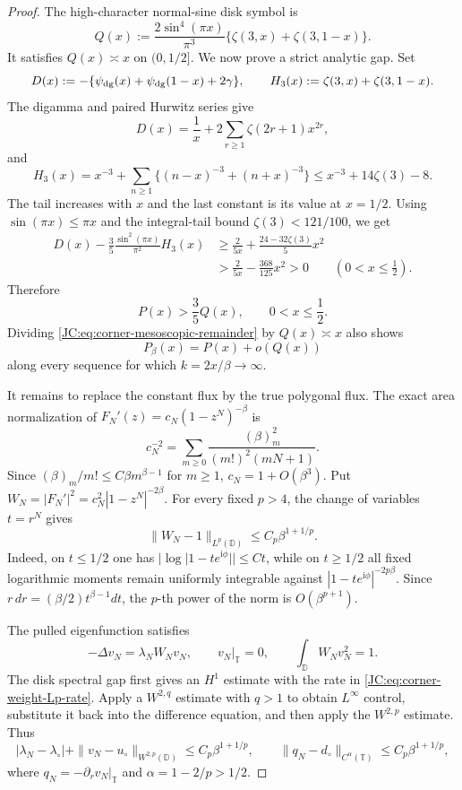 \begin{proof}
The high-character normal-sine disk symbol is
\begin{equation}\label{JC:eq:corner-disk-symbol}
 Q(x):=\frac{2\sin^4(\pi x)}{\pi^3}
 \{\zeta(3,x)+\zeta(3,1-x)\}.
\end{equation}
It satisfies $Q(x)\asymp x$ on $(0,1/2]$.  We now prove a strict
analytic gap.  Set
\[
 D(x):=-\{\psi_{\rm dg}(x)+\psi_{\rm dg}(1-x)+2\gamma\},
 \qquad H_3(x):=\zeta(3,x)+\zeta(3,1-x).
\]
The digamma and paired Hurwitz series give
\[
 D(x)=\frac1x+2\sum_{r\ge1}\zeta(2r+1)x^{2r},
\]
and
\[
 H_3(x)=x^{-3}+\sum_{n\ge1}\{(n-x)^{-3}+(n+x)^{-3}\}
 \le x^{-3}+14\zeta(3)-8.
\]
The tail increases with $x$ and the last constant is its value at
$x=1/2$.  Using $\sin(\pi x)\le\pi x$ and the integral-tail bound
$\zeta(3)<121/100$, we get
\begin{align*}
 D(x)-\frac35\frac{\sin^2(\pi x)}{\pi^2}H_3(x)
 &\ge\frac{2}{5x}+\frac{24-32\zeta(3)}5x^2\\
 &>\frac{2}{5x}-\frac{368}{125}x^2>0
 \qquad(0<x\le\tfrac12).
\end{align*}
Therefore
\begin{equation}\label{JC:eq:corner-three-fifths}
 \boxed{P(x)>\frac35Q(x),\qquad0<x\le\frac12.}
\end{equation}
Dividing \eqref{JC:eq:corner-mesoscopic-remainder} by $Q(x)\asymp x$
also shows
\begin{equation}\label{JC:eq:corner-relative-mesoscopic}
 P_\beta(x)=P(x)+o(Q(x))
\end{equation}
along every sequence for which $k=2x/\beta\to\infty$.

It remains to replace the constant flux by the true polygonal flux.
The exact area normalization of
$F_N'(z)=c_N(1-z^N)^{-\beta}$ is
\[
 c_N^{-2}=\sum_{m\ge0}
 \frac{(\beta)_m^2}{(m!)^2(mN+1)}.
\]
Since $(\beta)_m/m!\le C\beta m^{\beta-1}$ for $m\ge1$,
$c_N=1+O(\beta^3)$.  Put
$W_N=|F_N'|^2=c_N^2|1-z^N|^{-2\beta}$.  For every fixed $p>4$,
the change of variables $t=r^N$ gives
\begin{equation}\label{JC:eq:corner-weight-Lp-rate}
 \|W_N-1\|_{L^p(\mathbb D)}
 \le C_p\beta^{1+1/p}.
\end{equation}
Indeed, on $t\le1/2$ one has
$|\log|1-te^{\mathrm i\phi}||\le Ct$, while on $t\ge1/2$ all fixed
logarithmic moments remain uniformly integrable against
$|1-te^{\mathrm i\phi}|^{-2p\beta}$.  Since
$r\,dr=(\beta/2)t^{\beta-1}dt$, the $p$-th power of the norm is
$O(\beta^{p+1})$.

The pulled eigenfunction satisfies
\[
 -\Delta v_N=\lambda_NW_Nv_N,\qquad v_N|_{\mathbb T}=0,
 \qquad\int_{\mathbb D}W_Nv_N^2=1.
\]
The disk spectral gap first gives an $H^1$ estimate with the rate in
\eqref{JC:eq:corner-weight-Lp-rate}.  Apply a $W^{2,q}$ estimate with
$q>1$ to obtain $L^\infty$ control, substitute it back into the
difference equation, and then apply the $W^{2,p}$ estimate.  Thus
\begin{equation}\label{JC:eq:corner-flux-holder-rate}
 |\lambda_N-\lambda_\circ|
 +\|v_N-u_\circ\|_{W^{2,p}(\mathbb D)}
 \le C_p\beta^{1+1/p},
 \qquad
 \|q_N-d_\circ\|_{C^\alpha(\mathbb T)}
 \le C_p\beta^{1+1/p},
\end{equation}
where $q_N=-\partial_rv_N|_{\mathbb T}$ and
$\alpha=1-2/p>1/2$.


\end{proof}
